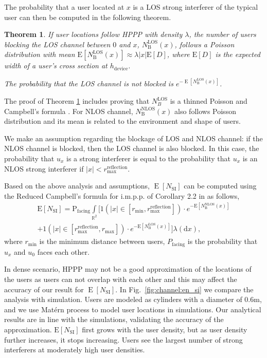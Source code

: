 \documentclass[10pt, conference, letterpaper]{IEEEtran}
\newtheorem{theorem}{Theorem}
\newcommand*{\Rom}[1]{\uppercase\expandafter{\romannumeral #1\relax}} %
\DeclareMathOperator*{\E}{\mathrm{E}}
\DeclareMathOperator*{\LOS}{\mathrm{LOS}}
\begin{document}
The probability that a user located at $x$ is a LOS strong interferer of the typical user can then be computed in the following theorem.

\begin{theorem}\label{theorem:E_N_B_LOS}
	If user locations follow HPPP with density $\lambda$, the number of users blocking the LOS channel between $0$ and $x$, $N_\mathrm{B}^\mathrm{LOS}(x)$, follows a Poisson distribution with mean $\mathrm{E}[N_{\mathrm{B}}^\mathrm{LOS}(x)] \approx \lambda |x| \mathrm{E}[D]$, where $\mathrm{E}[D]$ is the expected width of a user's cross section at $h_{\mathrm{device}}$.
	
	The probability that the LOS channel is not blocked is $e^{-\E[N_\mathrm{B}^\mathrm{LOS}(x)]}$.
\end{theorem}

The proof of Theorem \ref{theorem:E_N_B_LOS} includes proving that $N_B^{\LOS}$ is a thinned Poisson \cite{poisson} and Campbell's formula \cite{stochasticgeometry}.
For NLOS channel, $N_{\mathrm{B}}^\mathrm{NLOS}(x)$ also follows Poisson distribution and its mean is related to the environment and shape of users. 


We make an assumption regarding the blockage of LOS and NLOS channel: if the NLOS channel is blocked, then the LOS channel is also blocked. 
In this case, the probability that $u_x$ is a strong interferer is equal to the probability that $u_x$ is an NLOS strong interferer if $|x|<r_{\text{max}}^{\mathrm{reflection}}$.


Based on the above analysis and assumptions, $\E[N_{\mathrm{SI}}]$ can be computed using the Reduced Campbell's formula for i.m.p.p. of Corollary 2.2 in \cite{stochasticgeometry} as follows,
\begin{multline}\label{eq:E_N_SI}
\mathrm{E}[N_{\mathrm{SI}}] =  \mathrm{P}_{\text{facing}} \int\limits_{\mathbb{R}^2} 
 \big[\text{1}(|x|\in[r_{\min},r_{\text{max}}^{\mathrm{reflection}}])
\cdot e^{-\mathrm{E}[N_{\mathrm{B}}^\mathrm{NLOS}(x)]} \\
+ \text{1}(|x|\in[r_{\text{max}}^{\mathrm{reflection}},r_{\text{max}}])
\cdot e^{-\mathrm{E}[N_{\mathrm{B}}^\mathrm{LOS}(x)]} \big]\lambda(\mathrm{d}x),
\end{multline}
where $r_{\min}$ is the minimum distance between users, $P_{\text{facing}}$ is the probability that $u_x$ and $u_0$ faces each other.


In dense scenario, HPPP may not be a good approximation of the locations of the users as users can not overlap with each other and this may affect the accuracy of our result for $\E[N_{\mathrm{SI}}]$.
In Fig.~\ref{fig:channel:en_si} we compare the analysis with simulation.
Users are modeled as cylinders with a diameter of 0.6m, and we use Mat\'ern \Rom{3} process \cite{matern} to model user locations in simulations.
Our analytical results are in line with the simulations, validating the accuracy of the approximation. 
$\mathrm{E}[N_{\mathrm{SI}}]$ first grows with the user density, but as user density further increases, it stops increasing.
Users see the largest number of strong interferers at moderately high user densities. 
\end{document}
